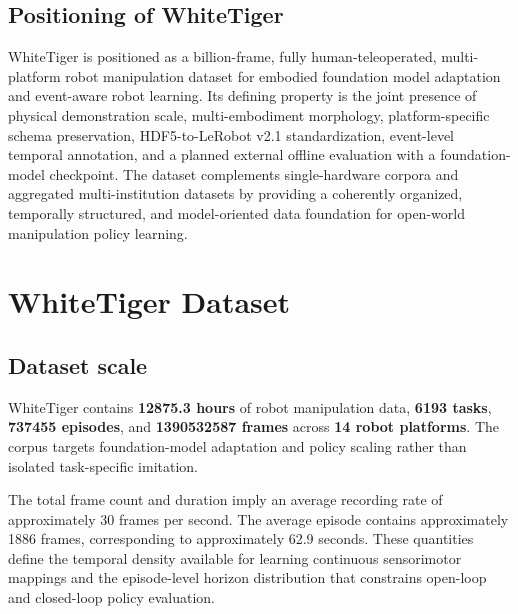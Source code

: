 \subsection{Positioning of WhiteTiger}

WhiteTiger is positioned as a billion-frame, fully human-teleoperated, multi-platform robot manipulation dataset for embodied foundation model adaptation and event-aware robot learning. Its defining property is the joint presence of physical demonstration scale, multi-embodiment morphology, platform-specific schema preservation, HDF5-to-LeRobot v2.1 standardization, event-level temporal annotation, and a planned external offline evaluation with a foundation-model checkpoint. The dataset complements single-hardware corpora and aggregated multi-institution datasets by providing a coherently organized, temporally structured, and model-oriented data foundation for open-world manipulation policy learning.

\section{WhiteTiger Dataset}

\subsection{Dataset scale}

WhiteTiger contains \textbf{12875.3 hours} of robot manipulation data, \textbf{6193 tasks}, \textbf{737455 episodes}, and \textbf{1390532587 frames} across \textbf{14 robot platforms}. The corpus targets foundation-model adaptation and policy scaling rather than isolated task-specific imitation.

The total frame count and duration imply an average recording rate of approximately 30 frames per second. The average episode contains approximately 1886 frames, corresponding to approximately 62.9 seconds. These quantities define the temporal density available for learning continuous sensorimotor mappings and the episode-level horizon distribution that constrains open-loop and closed-loop policy evaluation.